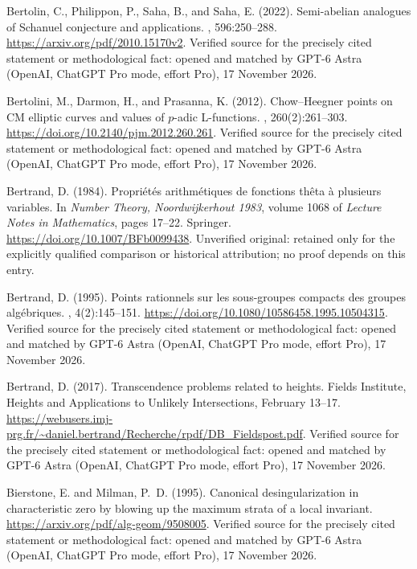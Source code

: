 \begin{thebibliography}{}
Bertolin, C., Philippon, P., Saha, B., and Saha, E. (2022).
\newblock Semi-abelian analogues of {Schanuel} conjecture and applications.
, 596:250--288.
\newblock \url{https://arxiv.org/pdf/2010.15170v2}. Verified source for the precisely cited statement or methodological fact: opened and matched by GPT-6 Astra (OpenAI, ChatGPT Pro mode, effort Pro), 17 November 2026.

Bertolini, M., Darmon, H., and Prasanna, K. (2012).
\newblock Chow--{H}eegner points on {CM} elliptic curves and values of
  {$p$}-adic {L}-functions.
, 260(2):261--303.
\newblock \url{https://doi.org/10.2140/pjm.2012.260.261}. Verified source for the precisely cited statement or methodological fact: opened and matched by GPT-6 Astra (OpenAI, ChatGPT Pro mode, effort Pro), 17 November 2026.

Bertrand, D. (1984).
\newblock Propri{\'e}t{\'e}s arithm{\'e}tiques de fonctions th{\^e}ta {\`a}
  plusieurs variables.
\newblock In {\em Number Theory, Noordwijkerhout 1983}, volume 1068 of {\em
  Lecture Notes in Mathematics}, pages 17--22. Springer.
\newblock \url{https://doi.org/10.1007/BFb0099438}. Unverified original: retained only for the explicitly qualified comparison or historical attribution; no proof depends on this entry.

Bertrand, D. (1995).
\newblock Points rationnels sur les sous-groupes compacts des groupes
  alg{\'e}briques.
, 4(2):145--151.
\newblock \url{https://doi.org/10.1080/10586458.1995.10504315}. Verified source for the precisely cited statement or methodological fact: opened and matched by GPT-6 Astra (OpenAI, ChatGPT Pro mode, effort Pro), 17 November 2026.

Bertrand, D. (2017).
\newblock Transcendence problems related to heights.
\newblock Fields Institute, Heights and Applications to Unlikely Intersections,
  February 13--17.
\newblock \url{https://webusers.imj-prg.fr/~daniel.bertrand/Recherche/rpdf/DB_Fieldspost.pdf}. Verified source for the precisely cited statement or methodological fact: opened and matched by GPT-6 Astra (OpenAI, ChatGPT Pro mode, effort Pro), 17 November 2026.

Bierstone, E. and Milman, P.~D. (1995).
\newblock Canonical desingularization in characteristic zero by blowing up the
  maximum strata of a local invariant.
\newblock \url{https://arxiv.org/pdf/alg-geom/9508005}. Verified source for the precisely cited statement or methodological fact: opened and matched by GPT-6 Astra (OpenAI, ChatGPT Pro mode, effort Pro), 17 November 2026.


\end{thebibliography}
